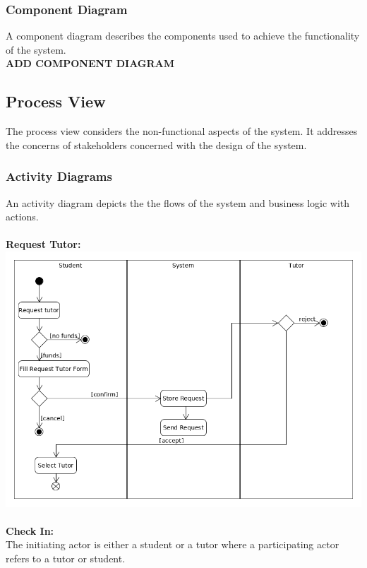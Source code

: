 \documentclass[12pt]{article}
\begin{document}
\subsubsection{Component Diagram}
A component diagram describes the components used to achieve the functionality of the system.\\
\textbf{ADD COMPONENT DIAGRAM}


\subsection{Process View}
The process view considers the non-functional aspects of the system. It addresses the concerns of stakeholders concerned
with the design of the system.\\

\subsubsection{Activity Diagrams}
An activity diagram depicts the the flows of the system and business logic with actions.\\
\\\textbf{Request Tutor:}\\
\includegraphics[width=140mm]{./activity_diagram/request_tutor.png}
\\\\\textbf{Check In:}\\
The initiating actor is either a student or a tutor where a participating actor refers to a tutor or student.\\
\end{document}
